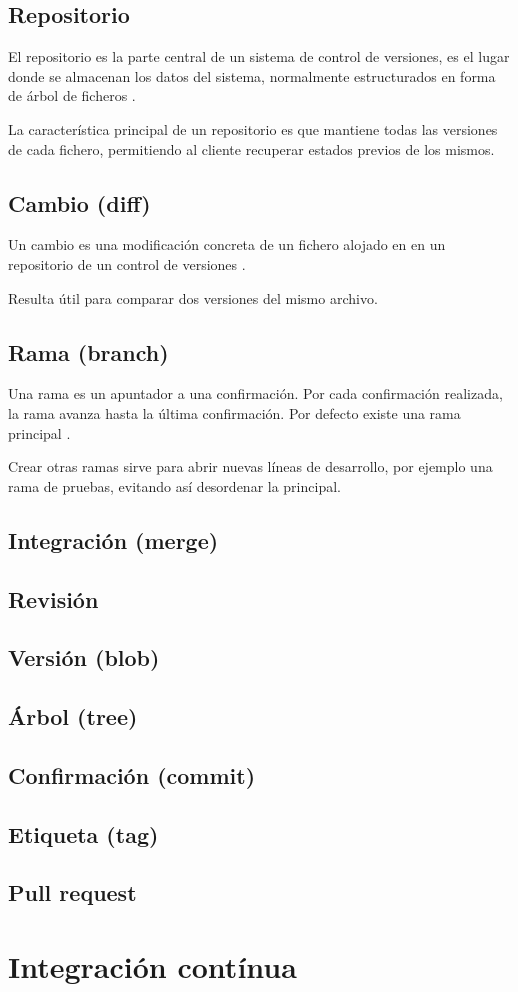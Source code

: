 \subsection{Repositorio}

El repositorio es la parte central de un sistema de control de versiones, es el lugar donde se almacenan los datos del sistema, normalmente estructurados en forma de árbol de ficheros \cite{Pilato:2008:VCS:1435405}.

La característica principal de un repositorio es que mantiene todas las versiones de cada fichero, permitiendo al cliente recuperar estados previos de los mismos.

\subsection{Cambio (diff)}

Un cambio es una modificación concreta de un fichero alojado en en un repositorio de un control de versiones \cite{wiki:002}.

Resulta útil para comparar dos versiones del mismo archivo.

\subsection{Rama (branch)}

Una rama es un apuntador a una confirmación. Por cada confirmación realizada, la rama avanza hasta la última confirmación. Por defecto existe una rama principal \cite{Chacon:2014:PG:2695634}. 

Crear otras ramas sirve para abrir nuevas líneas de desarrollo, por ejemplo una rama de pruebas, evitando así desordenar la principal.

\subsection{Integración (merge)}
\subsection{Revisión}
\subsection{Versión (blob)}
\subsection{Árbol (tree)}
\subsection{Confirmación (commit)}
\subsection{Etiqueta (tag)}
\subsection{Pull request}
\section{Integración contínua}
